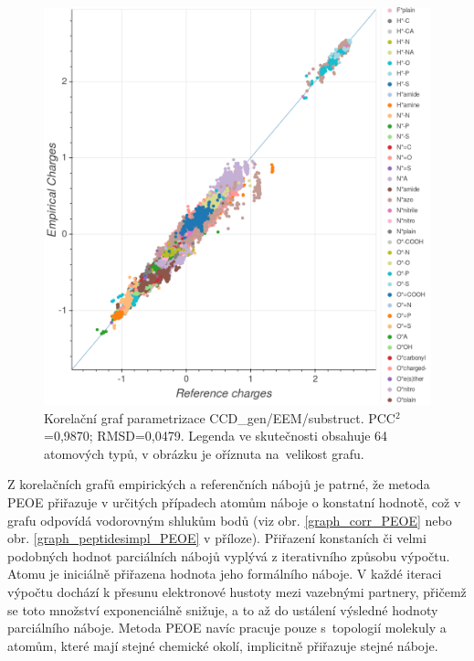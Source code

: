 \begin{figure}[H]
\begin{center}
\includegraphics[width=14cm]{pictures/graph_correlation_SDF_EEM_substruct.png}
\caption{Korelační graf parametrizace CCD\_gen/EEM/substruct.  PCC$^2$=0,9870; RMSD=0,0479. Legenda ve skutečnosti obsahuje 64 atomových typů, v obrázku je oříznuta na~velikost grafu.}
\label{graph_corr_EEM}
\end{center}
\end{figure}
\newpage

Z korelačních grafů empirických a referenčních nábojů je patrné, že metoda PEOE přiřazuje v určitých případech atomům náboje o konstatní hodnotě, což v grafu odpovídá vodorovným shlukům bodů (viz obr. \ref{graph_corr_PEOE} nebo obr. \ref{graph_peptidesimpl_PEOE} v příloze). Přiřazení konstaních či velmi podobných hodnot parciálních nábojů vyplývá z iterativního způsobu výpočtu. Atomu je iniciálně přiřazena hodnota jeho formálního náboje. V každé iteraci výpočtu dochází k přesunu elektronové hustoty mezi vazebnými partnery, přičemž se toto množství exponenciálně snižuje, a to až do ustálení výsledné hodnoty parciálního náboje. Metoda PEOE navíc pracuje pouze s~topologií molekuly a atomům, které mají stejné chemické okolí, implicitně přiřazuje stejné náboje.

